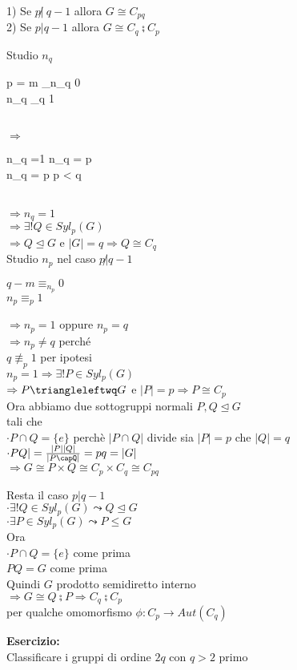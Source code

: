 \documentclass[12px]{article}
\begin{document}
\begin{dimo}
\begin{teo}
		  1) Se $p\not | \ q-1$ allora  $G\cong C_{pq}$\\
		  2) Se  $p | q-1$ allora  $G\cong C_q\semi C_p$
	\end{teo}
	\begin{dimo}
		Studio $n_q$ \\
		\begin{cases}
			p = m \equiv_{n_q} 0\\
			n_q \equiv_q 1
		\end{cases}\\
		$ \Rightarrow $ \begin{cases}
			n_q =1  n_q = p\\
			 n_q = p \text{ perchè } p < q

		\end{cases}\\
		$ \Rightarrow n_q = 1$ \\
		$ \Rightarrow \exists ! Q\in Syl_p(G)$\\
		$ \Rightarrow Q\trianglelefteq G$ e $|G| = q \Rightarrow Q\cong C_q$\\
		Studio $n_p$ nel caso $p\not | q -1$\\
		 \begin{cases}
			 $q-m \equiv_{n_p} 0$\\
			  $n_p\equiv_p 1$
		\end{cases}
		$ \Rightarrow n_p = 1$ oppure $n_p = q$\\
		 $ \Rightarrow n_p\neq q$ perché\\
		 $q\not\equiv_p 1$ per ipotesi\\
		  $n_p = 1 \Rightarrow \exists ! P\in Syl_p(G)$ \\
		  $ \Rightarrow P\triangleleftwq G$ e $|P| = p \Rightarrow P\cong C_p$ \\
		  Ora abbiamo due sottogruppi normali $P,Q\trianglelefteq G$\\
		  tali che\\
	  $\cdot P\cap Q = \{e\}$  perchè  $|P\cap Q|$ divide sia  $|P| = p$ che $|Q| = q$\\
	  $\cdot PQ| = \frac{|P||Q|}{|P\capQ|} = pq = |G|$\\
$ \Rightarrow G\cong P\times Q\cong C_p\times C_q\cong C_{pq}$

	Resta il caso $p | q-1$\\
	 $\cdot \exists ! Q\in Syl_p(G) \leadsto Q\trianglelefteq G$\\
	  $\cdot \exists P\in Syl_p(G)\leadsto P\leq G$\\
	  Ora\\
	  $\cdot P\cap Q = \{ e\}$ come prima\\
	   $PQ = G$ come prima\\
	   Quindi $G$ prodotto semidiretto interno\\
	   $ \Rightarrow G\cong Q\semi P \Rightarrow C_q \semi C_p$ \\
	   per qualche omomorfismo $\phi :C_p \rightarrow Aut(C_q)$
	\end{dimo}
	\textbf{Esercizio:}\\
	Classificare i gruppi di ordine $2q$ con  $q>2$ primo
	  \end{dimo}
\end{document}
